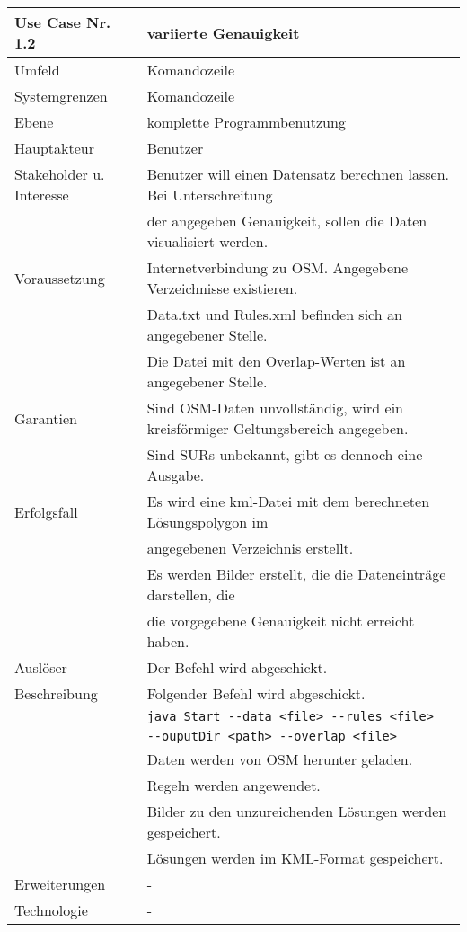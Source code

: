 \begin{tabular}{| l | l |}
 \hline
 \textbf{Use Case Nr. 1.2} & variierte Genauigkeit \\
 \hline
 Umfeld & Komandozeile\\
 \hline
 Systemgrenzen & Komandozeile\\
 \hline
 Ebene & komplette Programmbenutzung\\
 \hline
 Hauptakteur & Benutzer\\
 \hline
 Stakeholder u. Interesse & Benutzer will einen Datensatz berechnen lassen. Bei Unterschreitung\\
			  & der angegeben Genauigkeit, sollen die Daten visualisiert werden.\\
 \hline
 Voraussetzung & Internetverbindung zu OSM. Angegebene Verzeichnisse existieren.\\
	      & Data.txt und Rules.xml befinden sich an angegebener Stelle. \\
	      & Die Datei mit den Overlap-Werten ist an angegebener Stelle. \\
 \hline
 Garantien & Sind OSM-Daten unvollständig, wird ein kreisförmiger Geltungsbereich angegeben.\\
	  & Sind SURs unbekannt, gibt es dennoch eine Ausgabe.\\
 \hline
 Erfolgsfall & Es wird eine kml-Datei mit dem berechneten Lösungspolygon im\\
	    & angegebenen Verzeichnis erstellt.\\
	    & Es werden Bilder erstellt, die die Dateneinträge darstellen, die\\
	    & die vorgegebene Genauigkeit nicht erreicht haben.\\
 \hline
 Auslöser & Der Befehl wird abgeschickt.\\
 \hline
 Beschreibung & Folgender Befehl wird abgeschickt.\\
	    & \verb|java Start --data <file> --rules <file>|\\
	    & \hspace{24pt} \verb|--ouputDir <path> --overlap <file>|\\
	    & Daten werden von OSM herunter geladen.\\
	    & Regeln werden angewendet.\\
	    & Bilder zu den unzureichenden Lösungen werden gespeichert.\\
	    & Lösungen werden im KML-Format gespeichert.\\
 \hline
 Erweiterungen & -\\
 \hline
 Technologie & -\\
 \hline
\end{tabular}

